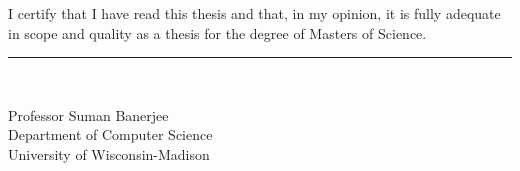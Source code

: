 \documentclass[12pt,oneside,letterpaper]{article}
\begin{document}
\begin{flushleft}
I certify that I have read this thesis and that, in my opinion, it is fully adequate in scope and quality as a thesis for the degree of Masters of Science.
\end{flushleft}

\vspace{2cm}

\noindent\rule{8cm}{1pt}\\

\vspace{0.1cm}

\begin{flushleft}
Professor Suman Banerjee\\
Department of Computer Science\\
University of Wisconsin-Madison\\
\end{flushleft}
\end{document}
